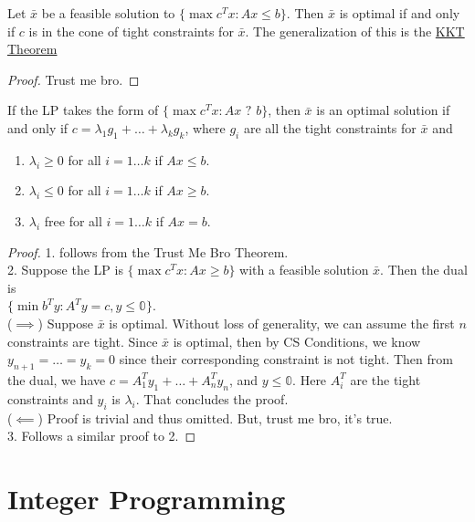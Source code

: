 \documentclass[a4paper]{report}
\begin{document}
\begin{theorem}
  Let $\bar x$ be a feasible solution to $\{\max c^T x : Ax \leq b\}$. Then $\bar x$ is optimal if and only if $c$ is in the cone of tight constraints for $\bar x$. The generalization of this is the \hyperref[kkt]{KKT Theorem}
\end{theorem}
\begin{proof}
    Trust me bro. 
\end{proof}
\begin{corollary}
  If the LP takes the form of $\{\max c^T x : Ax \text{ ? } b\}$, then $\bar x$ is an optimal solution if and only if $c = \lambda_1 g_1 + \dots + \lambda_k g_k$, where $g_i$ are all the tight constraints for $\bar x$ and 
  \begin{enumerate}
    \item $\lambda_i \geq 0$ for all $i = 1 \dots k$ if $Ax \leq b$.
    \item $\lambda_i \leq 0$ for all $i = 1 \dots k$ if $Ax \geq b$.
    \item $\lambda_i$ free for all $i = 1 \dots k$ if $Ax = b$.
  \end{enumerate}
\end{corollary}
\begin{proof}
  1. follows from the Trust Me Bro Theorem. \\[0.3in]
  2. Suppose the LP is $\{\max c^T x : Ax \geq b\}$ with a feasible solution $\bar x$. Then the dual is \\ $\{\min b^T y : A^T y = c, y \leq \mathbb 0\}$.\\[0.15in]
($\implies$) Suppose $\bar x$ is optimal. Without loss of generality, we can assume the first $n$ constraints are tight. Since $\bar x$ is optimal, then by CS Conditions, we know $y_{n+1} = \dots = y_k = 0$ since their corresponding constraint is not tight. Then from the dual, we have $c = A^T_1 y_1 + \dots + A^T_n y_n$, and $y \leq \mathbb 0$. Here $A^T_i$ are the tight constraints and $y_i$ is $\lambda_i$. That concludes the proof.\\[0.15in]
  ($\impliedby$) Proof is trivial and thus omitted. But, trust me bro, it's true. \\[0.3in]
  3. Follows a similar proof to 2.
\end{proof}

\chapter{Integer Programming}
\end{document}
